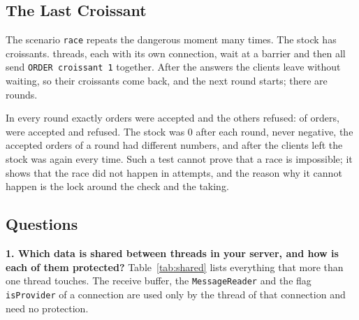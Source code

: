 \documentclass[12pt,a4paper]{article}
\begin{document}
\subsection{The Last Croissant}

The scenario \texttt{race} repeats the dangerous moment many times. The stock has \raceCroissants{} croissants. \raceClients{} threads, each with its own connection, wait at a barrier and then all send \texttt{ORDER croissant 1} together. After the answers the clients leave without waiting, so their croissants come back, and the next round starts; there are \raceRounds{} rounds.



In every round exactly \raceCroissants{} orders were accepted and the others refused: of \raceOrders{} orders, \raceAccepted{} were accepted and \raceRefused{} refused. The stock was 0 after each round, never negative, the accepted orders of a round had different numbers, and after the clients left the stock was \raceCroissants{} again every time. Such a test cannot prove that a race is impossible; it shows that the race did not happen in \raceOrders{} attempts, and the reason why it cannot happen is the lock around the check and the taking.

\subsection{Questions}

\textbf{1. Which data is shared between threads in your server, and how is each of them protected?} Table~\ref{tab:shared} lists everything that more than one thread touches. The receive buffer, the \texttt{MessageReader} and the flag \texttt{isProvider} of a connection are used only by the thread of that connection and need no protection.
\end{document}
